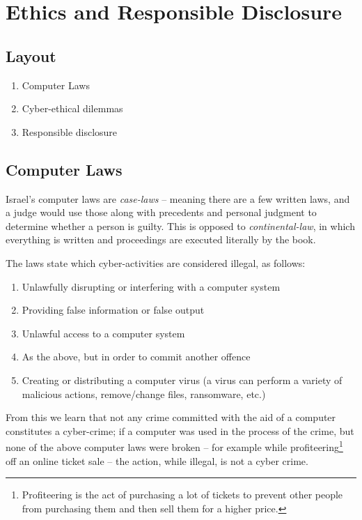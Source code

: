 \chapter{Ethics and Responsible Disclosure} \label{ethics_chapter}

\section*{Layout}

\begin{enumerate}
    \item Computer Laws
    \item Cyber-ethical dilemmas
    \item Responsible disclosure
\end{enumerate}

\section{Computer Laws}\label{sec:comp_laws}

Israel's computer laws are \textit{case-laws} – meaning there are a few written laws, and a judge would use those along with precedents and personal judgment to determine whether a person is guilty. This is opposed to \textit{continental-law}, in which everything is written and proceedings are executed literally by the book.

The laws state which cyber-activities are considered illegal, as follows:
\begin{enumerate}
    \item Unlawfully disrupting or interfering with a computer system
    \item Providing false information or false output
    \item Unlawful access to a computer system
    \item As the above, but in order to commit another offence
    \item Creating or distributing a computer virus (a virus can perform a variety of malicious actions, remove/change files, ransomware, etc.)
\end{enumerate}

From this we learn that not any crime committed with the aid of a computer constitutes a cyber-crime; if a computer was used in the process of the crime, but none of the above computer laws were broken -- for example while profiteering\footnote{Profiteering is the act of purchasing a lot of tickets to prevent other people from purchasing them and then sell them for a higher price.} off an online ticket sale -- the action, while illegal, is not a cyber crime.


